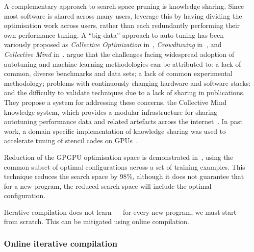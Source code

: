A complementary approach to search space pruning is knowledge sharing. Since most software is shared across many users, leverage this by having dividing the optimisation work across users, rather than each redundantly performing their own performance tuning. A ``big data'' approach to auto-tuning has been variously proposed as
\emph{Collective Optimization} in~\cite{Saclay2010},
\emph{Crowdtuning} in~\cite{Memon2013},
and \emph{Collective Mind} in~\cite{Fursin2014}.%
\citeauthor{Fursin2014} argue that the challenges facing widespread adoption of autotuning and machine learning methodologies can be attributed to: a lack of common, diverse benchmarks and data sets; a lack of common experimental methodology; problems with continuously changing hardware and software stacks; and the difficulty to validate techniques due to a lack of sharing in publications. They propose a system for addressing these concerns, the Collective Mind knowledge system, which provides a modular infrastructure for sharing autotuning performance data and related artefacts across the internet~\cite{Fursin2014}.
In past work, a domain specific implementation of knowledge sharing was used to accelerate tuning of stencil codes on GPUs~\cite{Cummins2016}.

Reduction of the GPGPU optimisation space is demonstrated in~\cite{Ryoo2008}, using the common subset of optimal configurations across a set of training examples. This technique reduces the search space by 98\%, although it does not guarantee that for a new program, the reduced search space will include the optimal configuration.

Iterative compilation does not learn --- for every new program, we must start from scratch. This can be mitigated using online compilation.


\subsubsection{Online iterative compilation}

